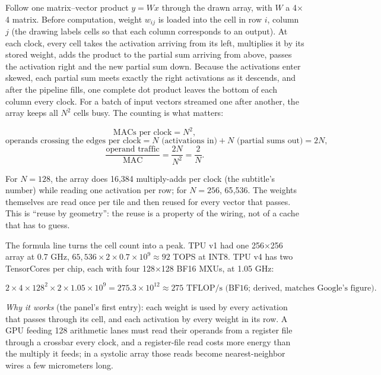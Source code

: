 \documentclass[11pt,letterpaper]{article}
\newenvironment{formulas}{\begin{tcolorbox}[formulabox]}{\end{tcolorbox}}
\begin{document}
Follow one matrix--vector product $y = Wx$ through the drawn array, with $W$ a 4$\times$4 matrix. Before computation, weight $w_{ij}$ is loaded into the cell in row $i$, column $j$ (the drawing labels cells so that each column corresponds to an output). At each clock, every cell takes the activation arriving from its left, multiplies it by its stored weight, adds the product to the partial sum arriving from above, passes the activation right and the new partial sum down. Because the activations enter skewed, each partial sum meets exactly the right activations as it descends, and after the pipeline fills, one complete dot product leaves the bottom of each column every clock. For a batch of input vectors streamed one after another, the array keeps all $N^2$ cells busy. The counting is what matters:
\begin{formulas}
\[ \text{MACs per clock} = N^2, \]
\[ \text{operands crossing the edges per clock} = N \text{ (activations in)} + N \text{ (partial sums out)} = 2N, \]
\[ \frac{\text{operand traffic}}{\text{MAC}} = \frac{2N}{N^2} = \frac{2}{N}. \]
\end{formulas}
For $N=128$, the array does 16{,}384 multiply-adds per clock (the subtitle's number) while reading one activation per row; for $N=256$, 65{,}536. The weights themselves are read once per tile and then reused for every vector that passes. This is ``reuse by geometry'': the reuse is a property of the wiring, not of a cache that has to guess.

The formula line turns the cell count into a peak. TPU v1 had one 256$\times$256 array at 0.7 GHz, $65{,}536 \times 2 \times 0.7\times10^9 \approx 92$ TOPS at INT8. TPU v4 has two TensorCores per chip, each with four 128$\times$128 BF16 MXUs, at 1.05 GHz:
\begin{formulas}
\[ 2 \times 4 \times 128^2 \times 2 \times 1.05\times10^{9} = 275.3\times10^{12} \approx 275 \text{ TFLOP/s (BF16; derived, matches Google's figure)}. \]
\end{formulas}

\emph{Why it works} (the panel's first entry): each weight is used by every activation that passes through its cell, and each activation by every weight in its row. A GPU feeding 128 arithmetic lanes must read their operands from a register file through a crossbar every clock, and a register-file read costs more energy than the multiply it feeds; in a systolic array those reads become nearest-neighbor wires a few micrometers long.
\end{document}
